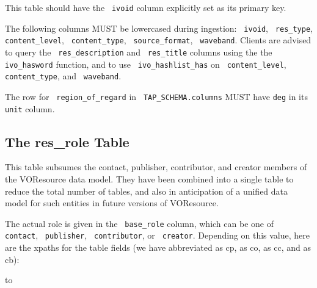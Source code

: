 \documentclass[11pt,a4paper]{ivoa}
\newcommand{\rtent}[1]{\texttt{\color{rtcolor} #1}}
\newcommand{\tapent}[1]{\texttt{\color{tapcolor} #1}}
\begin{document}


This table should have the \rtent{ivoid} column explicitly set
as its primary key.

The following columns MUST be lowercased during ingestion:
\rtent{ivoid}, \rtent{res\_type}, \rtent{content\_level},
\rtent{content\_type}, \rtent{source\_format},
\rtent{waveband}.
Clients are advised to query the \rtent{res\_description} and
\rtent{res\_title}  columns
using the the \rtent{ivo\_hasword} function, and to use
\rtent{ivo\_hashlist\_has} on \rtent{content\_level},
\rtent{content\_type}, and
\rtent{waveband}.

The row for \rtent{region\_of\_regard} in  
\tapent{TAP\_SCHEMA.columns} MUST have \texttt{deg} in its
\tapent{unit} column.


\subsection{The res\_role Table}

\label{table_res_role}

This table subsumes the contact, publisher, contributor, 
and creator members of the
VOResource data model.  They have been combined into a single table to
reduce the total number of tables, and also in anticipation of a unified
data model for such entities in future versions of VOResource.

The actual role is given in the \rtent{base\_role} column, which
can be one of \rtent{contact}, \rtent{publisher}, \rtent{contributor}, or
\rtent{creator}.  Depending on this value, here are the xpaths
for the table fields (we have abbreviated
as cp,  as co,  
as cc,
and  as cb):

\vspace{5pt}
\hbox to
\vskip5pt
\end{document}
